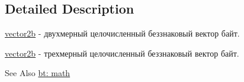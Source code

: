 \subsection{Detailed Description}
\hyperlink{classbt_1_1vector2b}{vector2b} -\/ двухмерный целочисленный беззнаковый вектор байт. 

\hyperlink{classbt_1_1vector2b}{vector2b} -\/ трехмерный целочисленный беззнаковый вектор байт.

\begin{DoxySeeAlso}{See Also}
\hyperlink{group__math}{bt\-: math} 
\end{DoxySeeAlso}
